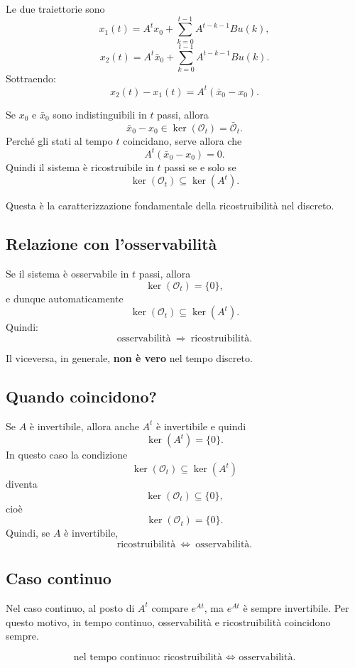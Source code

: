 Le due traiettorie sono
\[
x_1(t)=A^t x_0+\sum_{k=0}^{t-1} A^{t-k-1}Bu(k),
\]
\[
x_2(t)=A^t \bar x_0+\sum_{k=0}^{t-1} A^{t-k-1}Bu(k).
\]
Sottraendo:
\[
x_2(t)-x_1(t)=A^t(\bar x_0-x_0).
\]

Se \(x_0\) e \(\bar x_0\) sono indistinguibili in \(t\) passi, allora
\[
\bar x_0-x_0\in \ker(\mathcal O_t)=\bar{\mathcal O}_t.
\]
Perché gli stati al tempo \(t\) coincidano, serve allora che
\[
A^t(\bar x_0-x_0)=0.
\]
Quindi il sistema è ricostruibile in \(t\) passi se e solo se
\[
\boxed{
\ker(\mathcal O_t)\subseteq \ker(A^t).
}
\]

Questa è la caratterizzazione fondamentale della ricostruibilità nel discreto.

\subsection{Relazione con l'osservabilità}

Se il sistema è osservabile in \(t\) passi, allora
\[
\ker(\mathcal O_t)=\{0\},
\]
e dunque automaticamente
\[
\ker(\mathcal O_t)\subseteq \ker(A^t).
\]
Quindi:
\[
\boxed{
\text{osservabilità} \ \Longrightarrow\ \text{ricostruibilità}.
}
\]

Il viceversa, in generale, \textbf{non è vero} nel tempo discreto.

\subsection{Quando coincidono?}

Se \(A\) è invertibile, allora anche \(A^t\) è invertibile e quindi
\[
\ker(A^t)=\{0\}.
\]
In questo caso la condizione
\[
\ker(\mathcal O_t)\subseteq \ker(A^t)
\]
diventa
\[
\ker(\mathcal O_t)\subseteq \{0\},
\]
cioè
\[
\ker(\mathcal O_t)=\{0\}.
\]
Quindi, se \(A\) è invertibile,
\[
\boxed{
\text{ricostruibilità} \ \Longleftrightarrow\ \text{osservabilità}.
}
\]

\subsection{Caso continuo}

Nel caso continuo, al posto di \(A^t\) compare \(e^{At}\), ma \(e^{At}\) è sempre invertibile.  
Per questo motivo, in tempo continuo, osservabilità e ricostruibilità coincidono sempre.

\[
\boxed{
\text{nel tempo continuo: ricostruibilità } \Longleftrightarrow \text{ osservabilità.}
}
\]


